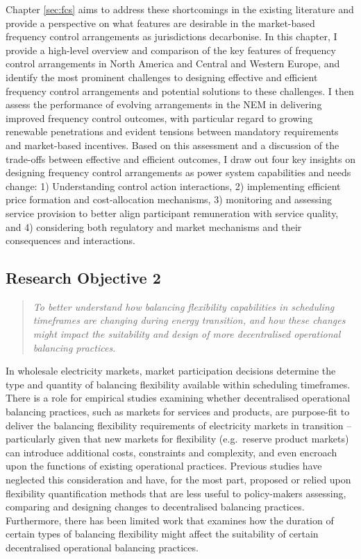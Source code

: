 \documentclass[12pt,a4paper,]{report}
\begin{document}
Chapter \ref{sec:fcs} aims to address these shortcomings in the existing
literature and provide a perspective on what features are desirable in
the market-based frequency control arrangements as jurisdictions
decarbonise. In this chapter, I provide a high-level overview and
comparison of the key features of frequency control arrangements in
North America and Central and Western Europe, and identify the most
prominent challenges to designing effective and efficient frequency
control arrangements and potential solutions to these challenges. I then
assess the performance of evolving arrangements in the NEM in delivering
improved frequency control outcomes, with particular regard to growing
renewable penetrations and evident tensions between mandatory
requirements and market-based incentives. Based on this assessment and a
discussion of the trade-offs between effective and efficient outcomes, I
draw out four key insights on designing frequency control arrangements
as power system capabilities and needs change: 1) Understanding control
action interactions, 2) implementing efficient price formation and
cost-allocation mechanisms, 3) monitoring and assessing service
provision to better align participant remuneration with service quality,
and 4) considering both regulatory and market mechanisms and their
consequences and interactions.

\hypertarget{research-objective-2}{%
\subsection{Research Objective 2}\label{research-objective-2}}

\begin{quote}
\emph{To better understand how balancing flexibility capabilities in
scheduling timeframes are changing during energy transition, and how
these changes might impact the suitability and design of more
decentralised operational balancing practices.}
\end{quote}

In wholesale electricity markets, market participation decisions
determine the type and quantity of balancing flexibility available
within scheduling timeframes. There is a role for empirical studies
examining whether decentralised operational balancing practices, such as
markets for services and products, are purpose-fit to deliver the
balancing flexibility requirements of electricity markets in transition
-- particularly given that new markets for flexibility (e.g.~reserve
product markets) can introduce additional costs, constraints and
complexity, and even encroach upon the functions of existing operational
practices. Previous studies have neglected this consideration and have,
for the most part, proposed or relied upon flexibility quantification
methods that are less useful to policy-makers assessing, comparing and
designing changes to decentralised balancing practices. Furthermore,
there has been limited work that examines how the duration of certain
types of balancing flexibility might affect the suitability of certain
decentralised operational balancing practices.
\end{document}
